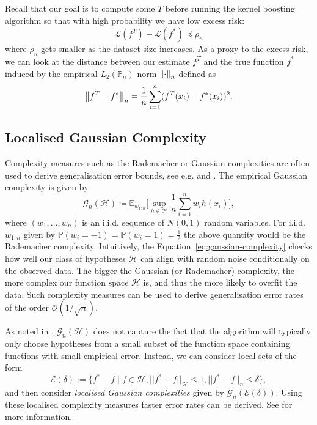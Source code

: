 Recall that our goal is to compute some $T$ before running the kernel boosting
algorithm so that with high probability we have low excess risk:
$$
\mathcal{L}(f^{T}) - \mathcal{L}(f^{*}) \preceq \rho_{n}
$$
where $\rho_{n}$ gets smaller as the dataset size increases.
As a proxy to the excess risk, we can look at the distance
between our estimate $f^{T}$ and the true function $f^{*}$ induced by the empirical
$L_{2}(\mathbb{P}_{n})$ norm $\left\lVert\cdot\right\rVert_{n}$ defined as
$$
\left\lVert f^{T} - f^{*}\right\rVert_{n} = \frac{1}{n} \sum_{i=1}^{n} (f^{T}(x_{i}) - f^{*}(x_{i}))^{2}.
$$

\subsection{Localised Gaussian Complexity}

Complexity measures such as the Rademacher or Gaussian complexities
are often used to derive generalisation error bounds, see e.g. \cite{bartlett2002rademacher}
and \cite{bartlett2005local}.
The empirical Gaussian complexity is given by
\begin{equation}
  \label{eq:gaussian-complexity}
  \mathcal{G}_{n}(\mathcal{H}) \coloneqq \mathbb{E}_{w_{1:n}}\Big[\sup_{h\in\mathcal{H}}\frac{1}{n}\sum_{i=1}^nw_ih(x_i)\Big],
\end{equation}
where $(w_1,\dots,w_n)$ is an i.i.d. sequence of $N(0,1)$ random variables.
For i.i.d. $w_{1:n}$ given by $\mathbb{P}(w_i=-1)=\mathbb{P}(w_i=1)=\frac{1}{2}$ the above quantity would
be the Rademacher complexity.
Intuitively, the Equation~\ref{eq:gaussian-complexity} checks how well our class
of hypotheses $\mathcal{H}$ can align with random noise conditionally on the observed data.
The bigger the Gaussian (or Rademacher) complexity, the more complex our function
space $\mathcal{H}$ is, and thus the more likely to overfit the data.
Such complexity measures can be used to derive generalisation error rates
of the order $\mathcal{O}(1/\sqrt{n})$.


As noted in \cite{bartlett2005local}, $\mathcal{G}_{n}(\mathcal{H})$ does not capture the fact
that the algorithm will typically only choose hypotheses from a small subset of the function space
containing functions with small empirical error. Instead, we can consider local sets of the
form
$$
  \mathcal{E}(\delta):= \{f^{*}-f \mid f\in\mathcal{H}, ||f^{*}-f||_{\mathcal{H}}\le 1, ||f^{*}-f||_n \leq \delta\},
$$
and then consider \textit{localised Gaussian complexities} given by
$\mathcal{G}_{n}(\mathcal{E}(\delta))$. Using these localised complexity measures
faster error rates can be derived. See \cite{bartlett2005local} for more information.


